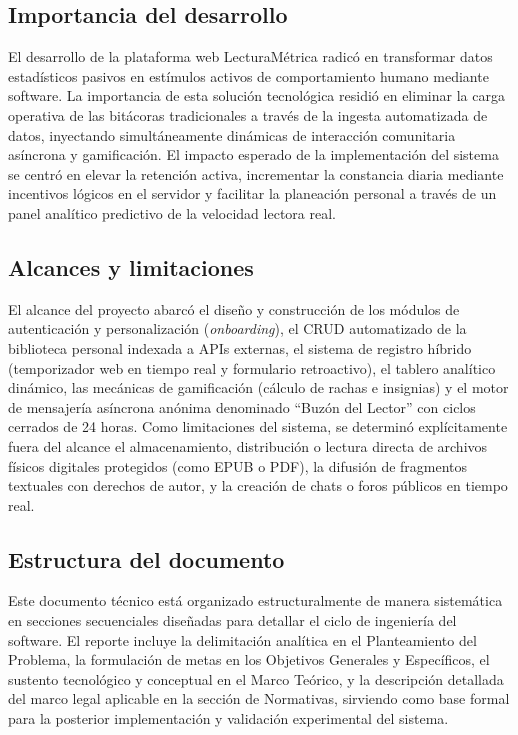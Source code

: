 \documentclass[12pt, atypical, journal]{article}
\begin{document}
\subsection{Importancia del desarrollo}
El desarrollo de la plataforma web LecturaMétrica radicó en transformar datos estadísticos pasivos en estímulos activos de comportamiento humano mediante software. La importancia de esta solución tecnológica residió en eliminar la carga operativa de las bitácoras tradicionales a través de la ingesta automatizada de datos, inyectando simultáneamente dinámicas de interacción comunitaria asíncrona y gamificación. El impacto esperado de la implementación del sistema se centró en elevar la retención activa, incrementar la constancia diaria mediante incentivos lógicos en el servidor y facilitar la planeación personal a través de un panel analítico predictivo de la velocidad lectora real.

\subsection{Alcances y limitaciones}
El alcance del proyecto abarcó el diseño y construcción de los módulos de autenticación y personalización (\textit{onboarding}), el CRUD automatizado de la biblioteca personal indexada a APIs externas, el sistema de registro híbrido (temporizador web en tiempo real y formulario retroactivo), el tablero analítico dinámico, las mecánicas de gamificación (cálculo de rachas e insignias) y el motor de mensajería asíncrona anónima denominado ``Buzón del Lector'' con ciclos cerrados de 24 horas. Como limitaciones del sistema, se determinó explícitamente fuera del alcance el almacenamiento, distribución o lectura directa de archivos físicos digitales protegidos (como EPUB o PDF), la difusión de fragmentos textuales con derechos de autor, y la creación de chats o foros públicos en tiempo real.

\subsection{Estructura del documento}
Este documento técnico está organizado estructuralmente de manera sistemática en secciones secuenciales diseñadas para detallar el ciclo de ingeniería del software. El reporte incluye la delimitación analítica en el Planteamiento del Problema, la formulación de metas en los Objetivos Generales y Específicos, el sustento tecnológico y conceptual en el Marco Teórico, y la descripción detallada del marco legal aplicable en la sección de Normativas, sirviendo como base formal para la posterior implementación y validación experimental del sistema.
\end{document}
